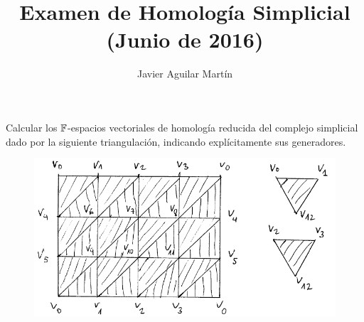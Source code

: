\documentclass[twoside]{article}
\begin{document}
\title{Examen de Homología Simplicial (Junio de 2016)}
\author{Javier Aguilar Martín}
\maketitle

\begin{ejercicio}{1}
Calcular los $\mathbb{F}$-espacios vectoriales de homología reducida del complejo simplicial dado por la siguiente triangulación, indicando explícitamente sus generadores.
\begin{figure}[h!]
\centering
\includegraphics[scale=0.7]{Junio2016-1}
\end{figure}
\end{ejercicio}
\end{document}
